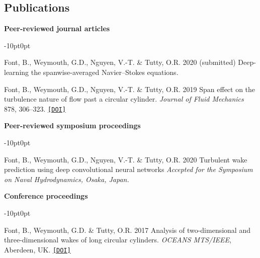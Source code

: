 \documentclass[line]{res}
\newenvironment{p}
  {\begin{adjustwidth}{-10pt}{0pt}}
  {\end{adjustwidth}}
\begin{document}
\begin{resume}
\section{Publications}
\vspace{0.25cm}
\hspace{-1cm}\textbf{Peer-reviewed journal articles}\vspace{0.25cm}
\begin{p}
\begin{etaremune}[leftmargin=-2pt,parsep=5pt]
\item Font, B., Weymouth, G.D., Nguyen, V.-T. \& Tutty, O.R. 2020 (submitted) Deep-learning the spanwise-averaged Navier--Stokes equations.
\item Font, B., Weymouth, G.D., Nguyen, V.-T. \& Tutty, O.R. 2019 Span effect on the turbulence nature of flow past a circular cylinder. \textit{Journal of Fluid Mechanics} 878, 306--323. \href{https://doi.org/10.1017/jfm.2019.637}{\texttt{[DOI]}}
\end{etaremune}
\end{p}

\hspace{-1cm}\textbf{Peer-reviewed symposium proceedings}\vspace{0.25cm}
\begin{p}
\begin{etaremune}[leftmargin=-2pt,parsep=5pt]
\item Font, B., Weymouth, G.D., Nguyen, V.-T. \& Tutty, O.R. 2020 Turbulent wake prediction using deep convolutional neural networks \textit{Accepted for the Symposium on Naval Hydrodynamics, Osaka, Japan.}
\end{etaremune}
\end{p}

\hspace{-1cm}\textbf{Conference proceedings}\vspace{0.25cm}
\begin{p}
\begin{etaremune}[leftmargin=-2pt,parsep=5pt]
\item Font, B., Weymouth, G.D.  \&  Tutty, O.R. 2017 Analysis of two-dimensional and three-dimensional wakes of long circular cylinders. {\em OCEANS MTS/IEEE}, Aberdeen, UK. \href{https://doi.org/10.1109/OCEANSE.2017.8084904}{\texttt{[DOI]}}
\end{etaremune}
\end{p}


\end{resume}
\end{document}
